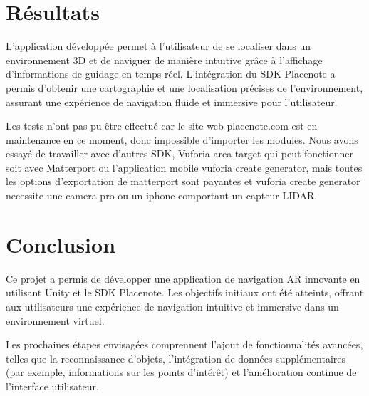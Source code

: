 \documentclass{article}
\begin{document}
\section{Résultats}
L'application développée permet à l'utilisateur de se localiser dans un environnement 3D et de naviguer de manière intuitive grâce à l'affichage d'informations de guidage en temps réel. L'intégration du SDK Placenote a permis d'obtenir une cartographie et une localisation précises de l'environnement, assurant une expérience de navigation fluide et immersive pour l'utilisateur.

Les tests n'ont pas pu être effectué car le site web placenote.com est en maintenance en ce moment, donc impossible d'importer les modules. Nous avons essayé de travailler avec d'autres SDK, Vuforia area target qui peut fonctionner soit avec Matterport ou l'application mobile vuforia create generator, mais toutes les options d'exportation de matterport sont payantes et vuforia create generator necessite une camera pro ou un iphone comportant un capteur LIDAR.

\section{Conclusion}
Ce projet a permis de développer une application de navigation AR innovante en utilisant Unity et le SDK Placenote. Les objectifs initiaux ont été atteints, offrant aux utilisateurs une expérience de navigation intuitive et immersive dans un environnement virtuel.

Les prochaines étapes envisagées comprennent l'ajout de fonctionnalités avancées, telles que la reconnaissance d'objets, l'intégration de données supplémentaires (par exemple, informations sur les points d'intérêt) et l'amélioration continue de l'interface utilisateur.
\end{document}
